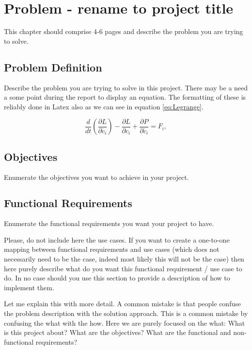 \chapter{Problem - rename to project title}
This chapter should comprise 4-6 pages and describe the problem you are trying to solve.

\section{Problem Definition}
Describe the problem you are trying to solve in this project. There may be a need a some point during the report to display an equation. The formatting of these is reliably done in Latex also as we can see in equation \ref{eq:Legrange}.

\begin{equation}
\frac{d}{dt}(\frac{\partial L}{\partial \dot{c_i}})-\frac{\partial L}{\partial c_i}+\frac{\partial P}{\partial \dot{c_i}} = F_i,
\label{eq:Legrange}
\end{equation}


\section{Objectives}
Enumerate the objectives you want to achieve in your project.

\section{Functional Requirements}
Enumerate the functional requirements you want your project to have. 

Please, do not include here the use cases. If you want to create a one-to-one mapping between functional requirements and use cases (which does not necessarily need to be the case, indeed most likely this will not be the case) then here purely describe what do you want this functional requirement / use case to do. In no case should you use this section to provide a description of how to implement them.  \citep{belqasmi2011restful}
\citet{Reference1}
\citet*{duan2012survey}
\citeauthor{duan2012survey}

Let me explain this with more detail. A common mistake is that people confuse the problem description with the solution approach. This is a common mistake by confusing the what with the how. Here we are purely focused on the what: What is this project about? What are the objectives? What are the functional and non-functional requirements? 

